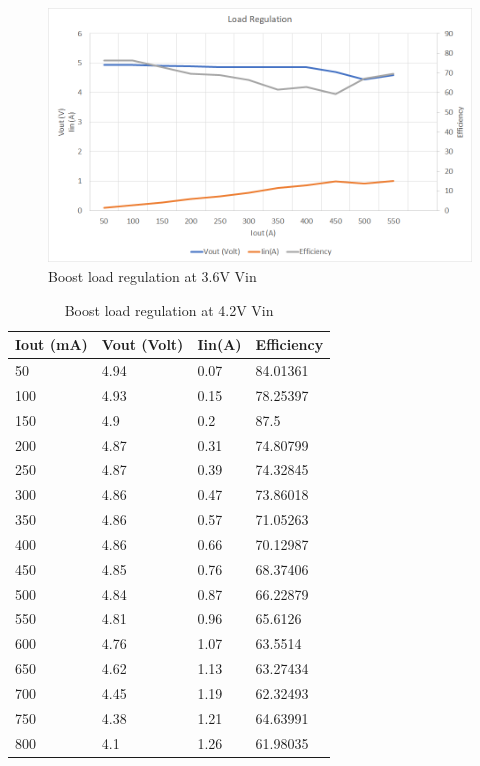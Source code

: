 \begin{figure}[H]
	\centering
	\includegraphics[width=\columnwidth]{IMGS/Boost load regulation at 3.6V Vin.png}
	\caption{Boost load regulation at 3.6V Vin}
	\label{fig:arch}
\end{figure}
\begin{table}[H]
\centering
\begin{tabular}{|l|l|l|l|}
\hline
Iout (mA) & Vout (Volt) & Iin(A) & Efficiency \\ \hline
50        & 4.94        & 0.07   & 84.01361   \\ \hline
100       & 4.93        & 0.15   & 78.25397   \\ \hline
150       & 4.9         & 0.2    & 87.5       \\ \hline
200       & 4.87        & 0.31   & 74.80799   \\ \hline
250       & 4.87        & 0.39   & 74.32845   \\ \hline
300       & 4.86        & 0.47   & 73.86018   \\ \hline
350       & 4.86        & 0.57   & 71.05263   \\ \hline
400       & 4.86        & 0.66   & 70.12987   \\ \hline
450       & 4.85        & 0.76   & 68.37406   \\ \hline
500       & 4.84        & 0.87   & 66.22879   \\ \hline
550       & 4.81        & 0.96   & 65.6126    \\ \hline
600       & 4.76        & 1.07   & 63.5514    \\ \hline
650       & 4.62        & 1.13   & 63.27434   \\ \hline
700       & 4.45        & 1.19   & 62.32493   \\ \hline
750       & 4.38        & 1.21   & 64.63991   \\ \hline
800       & 4.1         & 1.26   & 61.98035   \\ \hline
\end{tabular}
\caption{Boost load regulation at 4.2V Vin}
\label{table:4}
\end{table}
